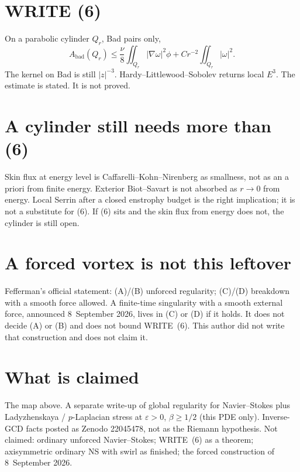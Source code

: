 \documentclass[11pt]{article}
\begin{document}
\section{WRITE (6)}

On a parabolic cylinder \(Q_r\), Bad pairs only,
\[
A_{\mathrm{bad}}(Q_r)
\le
\frac\nu8\iint_{Q_r}|\nabla\omega|^2\phi
+C r^{-2}\iint_{Q_r}|\omega|^2.
\]
The kernel on Bad is still \(|z|^{-3}\). Hardy--Littlewood--Sobolev
returns local \(E^3\). The estimate is stated. It is not proved.

\section{A cylinder still needs more than (6)}

Skin flux at energy level is Caffarelli--Kohn--Nirenberg as
smallness, not as an a priori from finite energy. Exterior
Biot--Savart is not absorbed as \(r\to 0\) from energy. Local
Serrin after a closed enstrophy budget is the right implication;
it is not a substitute for (6). If (6) sits and the skin flux
from energy does not, the cylinder is still open.

\section{A forced vortex is not this leftover}

Fefferman's official statement: (A)/(B) unforced regularity;
(C)/(D) breakdown with a smooth force allowed. A finite-time
singularity with a smooth external force, announced
8~September 2026, lives in (C) or (D) if it holds. It does not
decide (A) or (B) and does not bound WRITE~(6). This author did
not write that construction and does not claim it.

\section{What is claimed}

The map above. A separate write-up of global regularity for
Navier--Stokes plus Ladyzhenskaya / \(p\)-Laplacian stress at
\(\varepsilon>0\), \(\beta\ge 1/2\) (this PDE only). Inverse-GCD
facts posted as Zenodo 22045478, not as the Riemann hypothesis.
Not claimed: ordinary unforced Navier--Stokes; WRITE~(6) as a
theorem; axisymmetric ordinary NS with swirl as finished; the
forced construction of 8~September 2026.
\end{document}
